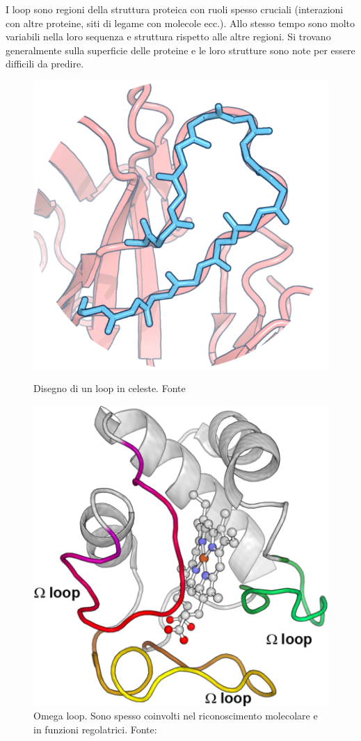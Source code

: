 I loop sono regioni della struttura proteica con ruoli spesso cruciali (interazioni con altre proteine, siti di legame con molecole ecc.). Allo stesso tempo sono molto variabili nella loro sequenza e struttura rispetto alle altre regioni. Si trovano generalmente sulla superficie delle proteine e le loro strutture sono note per essere difficili da predire.

\begin{figure}[!htb]
	\centering
	\includegraphics[scale= 1]{images/fread.png}
	\caption{Disegno di un loop in celeste. Fonte \cite{FREAD}}
	\label{fig:loop-example}
	\endminipage\hfill
	\centering
	\includegraphics[scale=0.3]{images/loops.png}
	\caption{Omega loop. Sono spesso coinvolti nel riconoscimento molecolare e in funzioni regolatrici. Fonte: \cite{Papaleo2016TheRO}}
	\label{fig:omega-loops}
	\endminipage\hfill
\end{figure}

